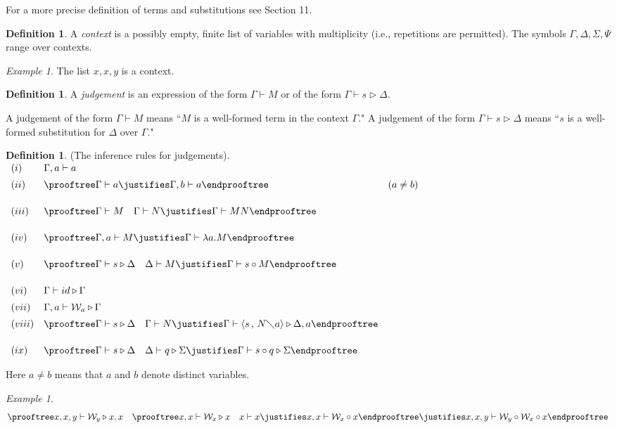 \documentclass[11pt]{amsart}
\def\ruleone#1#2{\prooftree #1 \justifies #2 \endprooftree}
\def\ruletwo#1#2#3{\ruleone{#1\quad #2}{#3}}
\theoremstyle{plain}
\theoremstyle{definition}
\newtheorem{definition}[theorem]{Definition}
\theoremstyle{remark}
\newtheorem{example}[theorem]{Example}
\numberwithin{equation}{section}
\newcommand{\tri}{\triangleright}
\newcommand{\ci}{\circ}
\newcommand{\mi}{\,,\,}
\newcommand{\is}{\diagdown}
\newcommand{\x}{a}
\newcommand{\y}{b}
\renewcommand{\pi}{\mathcal{W}}
\begin{document}
For  a more precise definition of terms and substitutions see
Section 11.
 \begin{definition}
A \emph{context} is a possibly empty, finite list of variables
with multiplicity (i.e., repetitions are permitted). The symbols
$\Gamma,\Delta,\Sigma,\Psi$ range over contexts.
\end{definition}
\begin{example}
The list $x,x,y$ is a context.
\end{example}
\begin{definition}
A \emph{judgement} is an expression of the form $\Gamma\vdash M$
or of the form $\Gamma\vdash s\tri\Delta$.
\end{definition}
A judgement of the form $\Gamma\vdash M$  means ``$M$ is a
well-formed term in the context $\Gamma$." A judgement of the form
$\Gamma\vdash s\tri\Delta$  means ``$s$ is a well-formed
substitution for $\Delta$ over $\Gamma$."
\begin{definition}\label{defsequentsder}(The inference rules for judgements).\\
$
\begin{array}{lll}
(i)& \Gamma,\x\vdash \x &\\[5pt]
(ii)& \ruleone{\Gamma\vdash
\x}{\Gamma,\y\vdash \x} & (\x\neq \y) \\[15pt]
(iii)& \ruletwo{\Gamma\vdash M}{\Gamma\vdash N}{\Gamma\vdash
MN} &\\[15pt]
(iv)& \ruleone{\Gamma,\x\vdash M}{\Gamma\vdash\lambda \x.M} &\\[15pt]
(v)& \ruletwo{\Gamma\vdash s\tri\Delta}{\Delta\vdash
M}{\Gamma\vdash
 s\ci M} &\\[15pt]
(vi)& \Gamma\vdash id\tri\Gamma &\\[5pt]
(vii)& \Gamma,\x\vdash\pi_{\x} \tri\Gamma &\\[5pt]
(viii)& \ruletwo{\Gamma\vdash s\tri\Delta}{\Gamma\vdash
N}{\Gamma\vdash
\langle s\mi N\is \x\rangle\tri\Delta ,\x} &\\[15pt]
(ix)& \ruletwo{\Gamma\vdash s\tri\Delta}{\Delta\vdash
q\tri\Sigma}{\Gamma\vdash s\ci q\tri\Sigma} &
\end{array}
$\\
\end{definition}
Here $\x\neq\y$ means that $\x$ and $\y$ denote distinct
variables.
\begin{example}
$$
\ruletwo{x,x,y\vdash \pi_y\tri x,x}{\ruletwo{x,x\vdash \pi_x\tri
x}{x\vdash x}{x,x\vdash \pi_x\ci x}}{x,x,y\vdash \pi_y\ci\pi_x\ci
x}
$$
\end{example}
\end{document}
